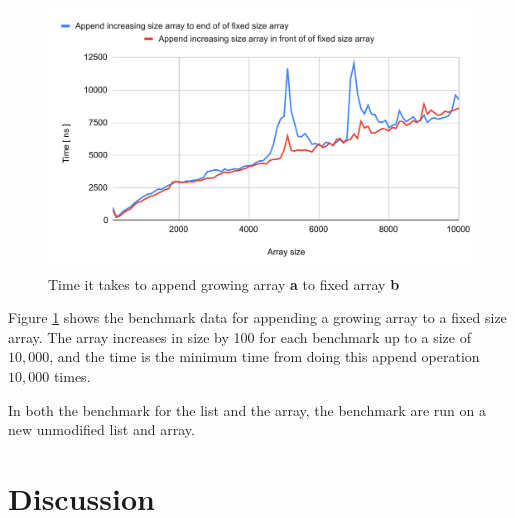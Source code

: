 \documentclass[a4paper,11pt]{article}
\begin{document}
\begin{figure}[h]
    \centering
    \includegraphics[width=.8\textwidth]{arrayAppend.pdf}
    \caption{Time it takes to append growing array \textbf{a} to fixed array \textbf{b}}
    \label{fig:arrayAppend}
\end{figure}

Figure \ref{fig:arrayAppend} shows the benchmark data for appending a growing array to a fixed size array. The array increases in 
size by 100 for each benchmark up to a size of $10,000$, and the time is the minimum time from doing this append operation $10,000$ 
times. 

In both the benchmark for the list and the array, the benchmark are run on a new unmodified list and array. 
\FloatBarrier
\section*{Discussion}
\end{document}
